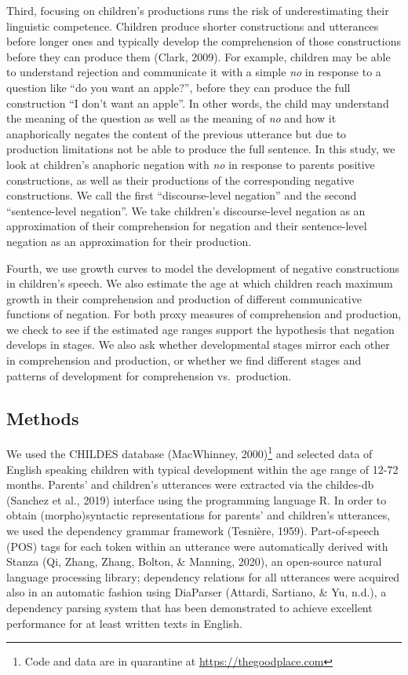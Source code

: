 \documentclass[
  man,floatsintext]{apa6}
\begin{document}
Third, focusing on children's productions runs the risk of underestimating their linguistic competence. Children produce shorter constructions and utterances before longer ones and typically develop the comprehension of those constructions before they can produce them (Clark, 2009). For example, children may be able to understand rejection and communicate it with a simple \emph{no} in response to a question like ``do you want an apple?'', before they can produce the full construction ``I don't want an apple''. In other words, the child may understand the meaning of the question as well as the meaning of \emph{no} and how it anaphorically negates the content of the previous utterance but due to production limitations not be able to produce the full sentence. In this study, we look at children's anaphoric negation with \emph{no} in response to parents positive constructions, as well as their productions of the corresponding negative constructions. We call the first ``discourse-level negation'' and the second ``sentence-level negation''. We take children's discourse-level negation as an approximation of their comprehension for negation and their sentence-level negation as an approximation for their production.

Fourth, we use growth curves to model the development of negative constructions in children's speech. We also estimate the age at which children reach maximum growth in their comprehension and production of different communicative functions of negation. For both proxy measures of comprehension and production, we check to see if the estimated age ranges support the hypothesis that negation develops in stages. We also ask whether developmental stages mirror each other in comprehension and production, or whether we find different stages and patterns of development for comprehension vs.~production.

\hypertarget{methods}{%
\subsection{Methods}\label{methods}}

We used the CHILDES database (MacWhinney, 2000)\footnote{Code and data are in quarantine at \url{https://thegoodplace.com}} and selected data of English speaking children with typical development within the age range of 12-72 months. Parents' and children's utterances were extracted via the childes-db (Sanchez et al., 2019) interface using the programming language R. In order to obtain (morpho)syntactic representations for parents' and children's utterances, we used the dependency grammar framework (Tesnière, 1959). Part-of-speech (POS) tags for each token within an utterance were automatically derived with Stanza (Qi, Zhang, Zhang, Bolton, \& Manning, 2020), an open-source natural language processing library; dependency relations for all utterances were acquired also in an automatic fashion using DiaParser (Attardi, Sartiano, \& Yu, n.d.), a dependency parsing system that has been demonstrated to achieve excellent performance for at least written texts in English.
\end{document}

